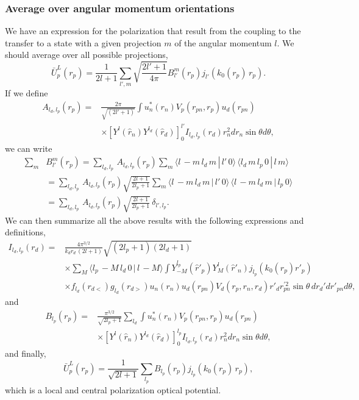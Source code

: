 \documentclass[a4paper,11pt]{article}
\begin{document}
\subsubsection{Average over angular momentum orientations} 
We have an expression for the polarization that result from the coupling to the transfer to a state with a given projection $m$ of the angular momentum $l$. We should average over all possible projections, 
 \begin{equation}\label{eq79}
 \bar U^L_p(r_p)=\frac{1}{2l+1}\sum_{l',m}\sqrt{\frac{2l'+1}{4\pi}} B^m_{l'}(r_p)j_{l'}(k_0(r_p) \,r_p).
 \end{equation}
 If we define 
  \begin{align}\label{eq81}
  \nonumber A_{l_d,l_p}(r_p)=&\frac{2\pi}{\sqrt{(2l'+1)}}\int u_n^*(r_n)V_p(r_{pn},r_p)u_d(r_{pn})\\
  &\times  \left[Y^{l}(\hat r_n)Y^{l_d}(\hat r_d)\right]^{l'}_0 I_{l_d,l_p}(r_d)r^2_n d r_n \sin\theta d\theta,
  \end{align}
we can write
\begin{align}\label{eq80}
\nonumber    \sum_m &B^m_{l'}(r_p)=\sum_{l_d,l_p}\,A_{l_d,l_p}(r_p)\sum_m \langle l\,-m\,l_d\,m\,|\,l'\,0\rangle\,\langle l_d\,m\,l_p\,0\,|\,l\,m\rangle \\
&=\sum_{l_d,l_p}\,A_{l_d,l_p}(r_p)\sqrt{\frac{2l+1}{2l_p+1}}\sum_m \langle l\,-m\,l_d\,m\,|\,l'\,0\rangle\,\langle l\,-m\,l_d\,m\,|\,l_p\,0\rangle\\
&=\sum_{l_d,l_p}\,A_{l_d,l_p}(r_p)\sqrt{\frac{2l+1}{2l_p+1}}\,\delta_{l',l_p}.
\end{align}
We can then summarize all the above results with the following expressions and definitions,
 \begin{align}\label{eq83}
 \nonumber I_{l_d,l_p}(r_d)=&\frac{4\pi^{3/2}}{k_dr_d\,(2l+1)}\sqrt{(2l_p+1)(2l_d+1)}\\
 \nonumber&\times\sum_{M}\langle l_p\,-M\,l_d\,0\,|\,l\,-M\rangle  \int  Y^{l_p}_{-M}(\hat r'_p)Y^{l}_{M}(\hat r'_n)j_{l_p}(k_0(r_p) r'_p)\\
 &\times f_{l_d}(r_{d<})g_{l_d}(r_{d>})u_n(r_n)u_d(r_{pn}) V_{d}(r_{p},r_n,r_d) r'_dr_{pn}^{'2}\sin\theta\, d r_d'dr'_{pn}d\theta,
 \end{align}
 and
 \begin{align}\label{eq82}
 \nonumber B_{l_p}(r_p)=&\frac{\pi^{3/2}}{\sqrt{2l_p+1}}\sum_{l_d}\int u_n^*(r_n)V_p(r_{pn},r_p)u_d(r_{pn})\\
 &\times  \left[Y^{l}(\hat r_n)Y^{l_d}(\hat r_d)\right]^{l_p}_0 I_{l_d,l_p}(r_d)r^2_n d r_n \sin\theta d\theta,
 \end{align}
 and finally,
 \begin{equation}\label{eq84}
 \bar U^L_p(r_p)=\frac{1}{\sqrt{2l+1}}\sum_{l_p} B_{l_p}(r_p)j_{l_p}(k_0(r_p) \,r_p),
 \end{equation} 
which is a local and central polarization optical potential.
\end{document}
